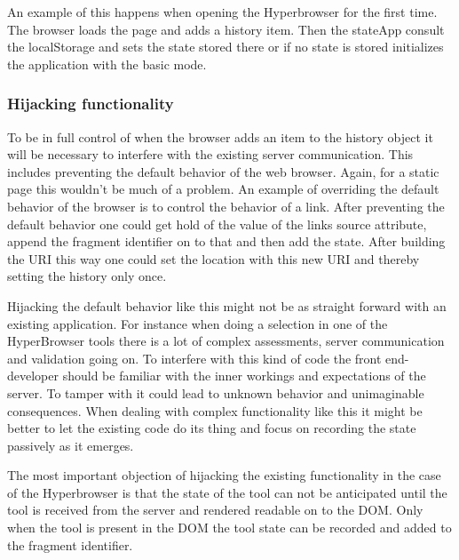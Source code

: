 \documentclass[english]{ifimaster}
\begin{document}

An example of this happens when opening the Hyperbrowser for the first time. The browser loads the page and adds a history item. Then the stateApp consult the localStorage and sets the state stored there or if no state is stored initializes the application with the basic mode. 

\subsubsection{Hijacking functionality}
To be in full control of when the browser adds an item to the history object it will be necessary to interfere with the existing server communication. This includes preventing the default behavior of the web browser. Again, for a static page this wouldn't be much of a problem. An example of overriding the default behavior of the browser is to control the behavior of a link. After preventing the default behavior one could get hold of the value of the links source attribute, append the fragment identifier on to that and then add the state. After building the URI this way one could set the location with this new URI and thereby setting the history only once. 

Hijacking the default behavior like this might not be as straight forward with an existing application. For instance when doing a selection in one of the HyperBrowser tools there is a lot of complex assessments, server communication and validation going on. To interfere with this kind of code the front end-developer should be familiar with the inner workings and expectations of the server. To tamper with it could lead to unknown behavior and unimaginable consequences. When dealing with complex functionality like this it might be better to let the existing code do its thing and focus on recording the state passively as it emerges.

The most important objection of hijacking the existing functionality in the case of the Hyperbrowser is that the state of the tool can not be anticipated until the tool is received from the server and rendered readable on to the DOM. Only when the tool is present in the DOM the tool state can be recorded and added to the fragment identifier.
\end{document}
